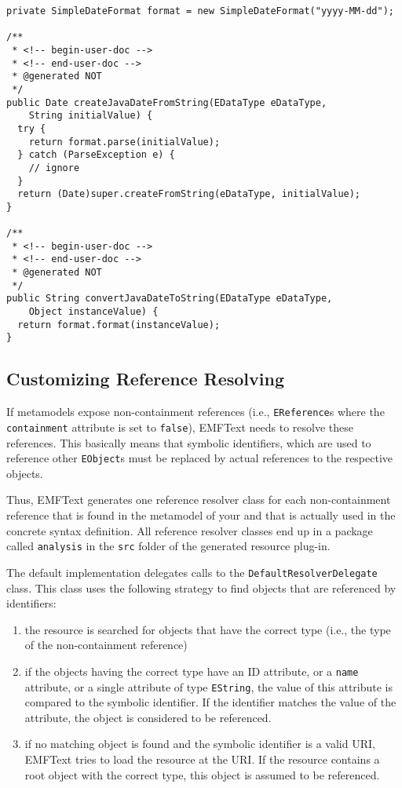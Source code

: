 \begin{lstlisting}
private SimpleDateFormat format = new SimpleDateFormat("yyyy-MM-dd");

/**
 * <!-- begin-user-doc -->
 * <!-- end-user-doc -->
 * @generated NOT
 */
public Date createJavaDateFromString(EDataType eDataType, 
    String initialValue) {
  try {
    return format.parse(initialValue);
  } catch (ParseException e) {
    // ignore
  }
  return (Date)super.createFromString(eDataType, initialValue);
}

/**
 * <!-- begin-user-doc -->
 * <!-- end-user-doc -->
 * @generated NOT
 */
public String convertJavaDateToString(EDataType eDataType, 
    Object instanceValue) {
  return format.format(instanceValue);
}
\end{lstlisting}

\subsection{Customizing Reference Resolving}
\label{sec:cust_reference_resolving}

If metamodels expose non-containment references (i.e., \texttt{EReference}s
where the \texttt{containment} attribute is set to \texttt{false}), EMFText
needs to resolve these references. This basically means that symbolic
identifiers, which are used to reference other \texttt{EObject}s must be
replaced by actual references to the respective objects.

Thus, EMFText generates one reference resolver class for each non-containment
reference that is found in the metamodel of your \DSL and that is actually used
in the concrete syntax definition. All reference resolver classes end up in a
package called \texttt{analysis} in the \texttt{src} folder of the generated 
resource plug-in.

The default implementation delegates calls to the
\texttt{DefaultResolverDelegate} class. This class uses the following strategy
to find objects that are referenced by identifiers:

\begin{enumerate}
  \item the resource is searched for objects that have the correct type (i.e.,
  the type of the non-containment reference)
  \item if the objects having the correct type have an ID attribute, or a
  \texttt{name} attribute, or a single attribute of type \texttt{EString}, the
  value of this attribute is compared to the symbolic identifier. If the
  identifier matches the value of the attribute, the object is considered to be
  referenced.
  \item if no matching object is found and the symbolic identifier is a valid
  URI, EMFText tries to load the resource at the URI. If the resource
  contains a root object with the correct type, this object is assumed to be
  referenced.
\end{enumerate}

